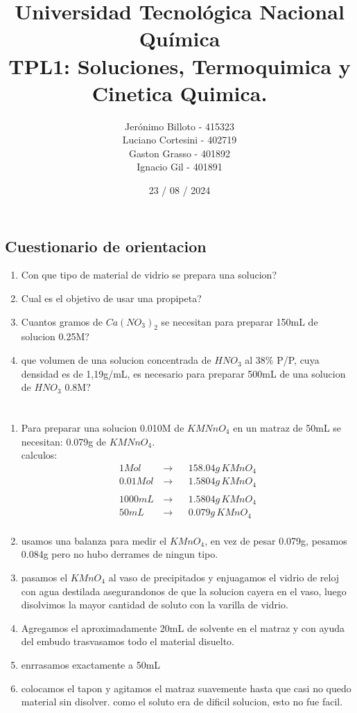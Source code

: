 \documentclass[12pt,a4paper]{report}
\title{%
  \fontsize{25}{0}\selectfont Universidad Tecnológica Nacional \\
  \fontsize{22}{30}\selectfont Química \\
  \fontsize{18}{25}\selectfont TPL1: Soluciones, Termoquimica y Cinetica Quimica.
}
\author{
  Jerónimo Billoto - 415323\\
  Luciano Cortesini - 402719\\
  Gaston Grasso - 401892\\
  Ignacio Gil - 401891\\
}
\date{23 / 08 / 2024}
\begin{document}
\maketitle
\section*{Cuestionario de orientacion}

\begin{enumerate}

  \item Con que tipo de material de vidrio se prepara una solucion?
  \item Cual es el objetivo de usar una propipeta?
  \item Cuantos gramos de $Ca(NO_3)_2$ se necesitan para preparar 150mL de solucion 0.25M?
  \item que volumen de  una solucion concentrada de $HNO_3$ al $38\% $ P/P, cuya densidad es de 1,19g/mL, es necesario para preparar 500mL de una solucion de $HNO_3$ 0.8M?
 
\end{enumerate}

\chapter{}

\begin{enumerate}[label=\alph*]

\item Para preparar una solucion 0.010M de $KMNnO_4$ en un matraz de 50mL se necesitan: 0.079g de $KMNnO_4$.\\
  
  
  calculos:
      $$
\begin{aligned}
   1 Mol  \, &\rightarrow&& 158.04g \,KMnO_4\\[6pt]
   0.01 Mol  \, &\rightarrow&& 1.5804g \,KMnO_4\\[6pt]
    \\
   1000mL \,  &\rightarrow&& 1.5804g \,KMnO_4  \\[6pt]
    50mL\,  &\rightarrow&& 0.079g \, KMnO_4\\[6pt]
\end{aligned}
$$

\item usamos una balanza para medir el $KMnO_4$, en vez de pesar 0.079g, pesamos 0.084g pero no hubo derrames de ningun tipo.
\item pasamos el $KMnO_4$ al vaso de precipitados y enjuagamos el vidrio de reloj con agua destilada asegurandonos de que la solucion cayera en el vaso, luego disolvimos la mayor cantidad de soluto con la varilla de vidrio.
\item Agregamos el aproximadamente 20mL de solvente en el matraz y con ayuda del embudo trasvasamos todo el material disuelto.
\item enrrasamos exactamente a 50mL
\item colocamos el tapon y agitamos el matraz suavemente hasta que casi no quedo material sin disolver. como el soluto era de dificil solucion, esto no fue facil.

\end{enumerate}
 
\end{document}
